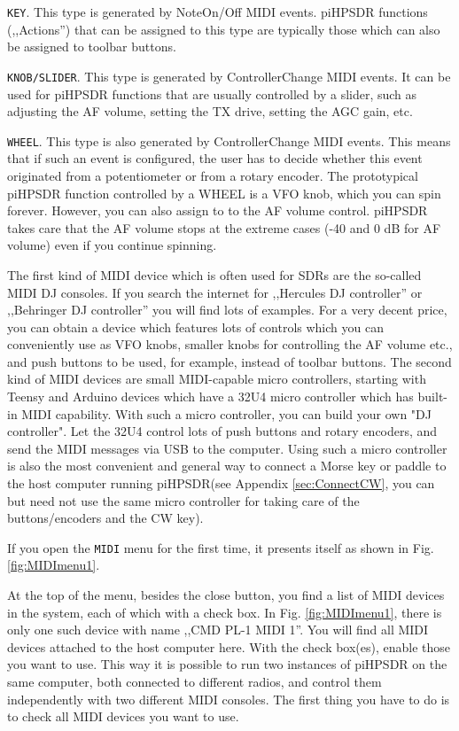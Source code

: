 \documentclass[12pt]{book}
\def\rett#1{\texttt{\color{red}#1}}
\def\bltt#1{\texttt{\color{blue}#1}}
\def\pH{pi\-HPSDR\xspace}
\begin{document}
\rett{KEY}. This type is generated by NoteOn/Off MIDI events. \pH functions (,,Actions'') that
can be assigned to this type are typically those which can also be assigned to toolbar
buttons.

\rett{KNOB/SLIDER}. This type is generated by ControllerChange MIDI events. It can be used
for \pH functions that are usually controlled by a slider, such as adjusting the AF
volume, setting the TX drive, setting the AGC gain, etc.

\rett{WHEEL}. This type is also generated by ControllerChange MIDI events. This means
that if such an event is configured, the user has to decide whether this event
originated from a potentiometer or from a rotary encoder. The prototypical \pH
function controlled by a WHEEL is a VFO knob, which you can spin forever. However,
you can also assign to to the AF volume control. \pH takes care that the
AF volume stops at the extreme cases (-40 and 0 dB for AF volume) even if you continue
spinning.

The first kind of MIDI device which is often used for SDRs are the so-called MIDI DJ
consoles. If you search the internet for ,,Hercules DJ controller'' or ,,Behringer
DJ controller'' you will find lots of examples. For a very decent price, you
can obtain a device which features lots of controls which you can conveniently use
as VFO knobs, smaller knobs for controlling the AF volume etc., and push buttons
to be used, for example, instead of toolbar buttons. The second kind of MIDI devices
are small MIDI-capable micro controllers, starting with Teensy and Arduino devices
which have a 32U4 micro controller which has built-in MIDI capability. With such a
micro controller, you can build your own "DJ controller". Let the 32U4 control
lots of push buttons and rotary encoders, and send the MIDI messages via USB to the
computer. Using such a micro controller is also the most convenient and general way
to connect a Morse key or paddle to the host computer running \pH (see
Appendix \ref{sec:ConnectCW}, you can but need not use the same micro controller
for taking care of the buttons/encoders and the CW key).

If you open the \bltt{MIDI} menu for the first time, it presents itself as shown
in Fig. \ref{fig:MIDImenu1}.



At the top of the menu, besides the close button, you find a list of MIDI devices
in the system, each of which with a check box. In Fig. \ref{fig:MIDImenu1}, there is only
one such device with name ,,CMD PL-1 MIDI 1''. You will find all MIDI devices attached
to the host computer here. With the check box(es), enable those you want to use.
This way it is possible to run two instances of \pH on the same computer, both
connected to different radios, and control them independently with two different MIDI
consoles. The first thing you have to do is to check all MIDI devices you want to use.
\end{document}
